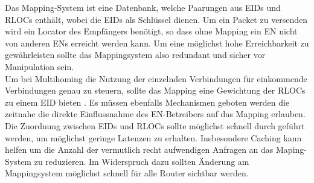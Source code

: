 Das Mapping-System ist eine Datenbank, welche Paarungen aus EIDs und RLOCs enthält, wobei die EIDs als Schlüssel dienen. Um ein Packet zu versenden wird ein Locator des Empfängers benötigt, so dass ohne Mapping ein EN nicht von anderen ENs erreicht werden kann. Um eine möglichst hohe Erreichbarkeit zu gewährleisten sollte das Mappingsystem also redundant und sicher vor Manipulation sein. \\
Um bei Multihoming die Nutzung der einzelnden Verbindungen für einkommende Verbindungen genau zu steuern, sollte das Mapping eine Gewichtung der RLOCs zu einem EID bieten \cite{mathy:2008:dht}. Es müssen ebenfalls Mechanismen geboten werden die zeitnahe die direkte Einflussnahme des EN-Betreibers auf das Mapping erlauben. \\
Die Zuordnung zwischen EIDs und RLOCs sollte möglichst schnell durch geführt werden, um möglichst geringe Latenzen zu erhalten. Insbesondere Caching kann helfen um die Anzahl der vermutlich recht aufwendigen Anfragen an das Maping-System zu reduzieren. Im Widerspruch dazu sollten Änderung am Mappingsystem möglichst schnell für alle Router sichtbar werden. \\

